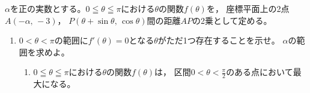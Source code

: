 \documentclass[../../main.tex]{subfiles}
\begin{document}
$\alpha$を正の実数とする。$0 \leqq \theta \leqq \pi$における$\theta$の関数$f(\theta)$を，
座標平面上の2点$A(-\alpha, \, -3)$，
$P(\theta+\sin\theta, \, \cos\theta)$間の距離$AP$の2乗として定める。
\begin{enumerate}
  \item$0<\theta<\pi$の範囲に$f'(\theta)=0$となる$\theta$がただ1つ存在することを示せ。
  $\alpha$の範囲を求めよ。
    \begin{enumerate}
      \item[]$0\leqq\theta\leqq\pi$における$\theta$の関数$f(\theta)$は，
        区間$\displaystyle 0<\theta<\frac{\pi}{2}$のある点において最大になる。
    \end{enumerate}
\end{enumerate}
\end{document}
